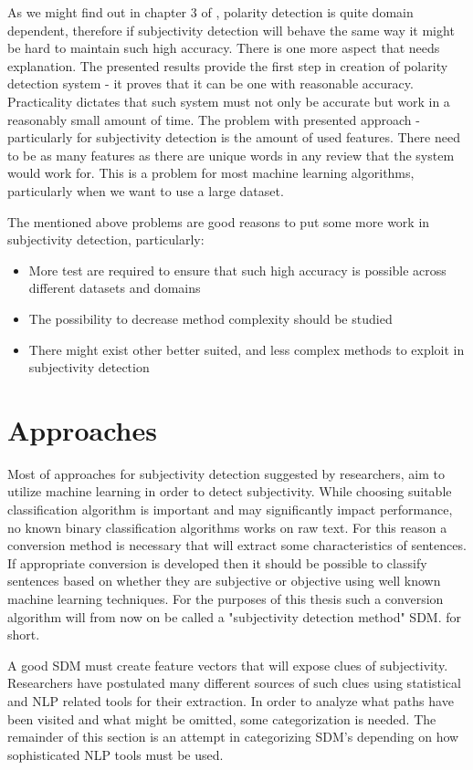 As we might find out in chapter 3 of \cite{PangLee2008}, polarity detection is quite domain dependent, therefore if subjectivity detection will behave the same
way it might be hard to maintain such high accuracy. There is one more aspect that needs explanation. The presented results provide the first step in
creation of polarity detection system - it proves that it can be one with reasonable accuracy.  Practicality dictates that such system must not only
be accurate but work in a reasonably small amount of time. The problem with presented approach - particularly for subjectivity detection is the amount
of used features. There need to be as many features as there are unique words in any review that the system would work for. This is a problem for most
machine learning algorithms, particularly when we want to use a large dataset.

The mentioned above problems are good reasons to put some more work in subjectivity detection, particularly:
\begin{itemize}
\item More test are required to ensure that such high accuracy is possible across different datasets and domains
\item The possibility to decrease method complexity should be studied 
\item There might exist other better suited, and less complex methods to exploit in subjectivity detection
\end{itemize} 

\section{Approaches}

Most of approaches for subjectivity detection suggested by researchers, aim to utilize machine learning in order to detect subjectivity. While
choosing suitable classification algorithm is important and may significantly impact performance, no known binary classification algorithms works on
raw text. For this reason a conversion method is necessary that will extract some characteristics of sentences. If appropriate conversion is developed
then it should be possible to classify sentences based on whether they are subjective or objective using well known machine learning techniques. For the 
purposes of this thesis such a conversion algorithm will from now on be called a "subjectivity detection method" SDM. for short.

A good SDM must create feature vectors that will expose clues of subjectivity. Researchers have postulated many different sources of such clues using
statistical and NLP related tools for their extraction.  In order to analyze what paths have been visited and what might be omitted, some
categorization is needed. The remainder of this section is an attempt in categorizing SDM's depending on how sophisticated NLP tools must be used.


